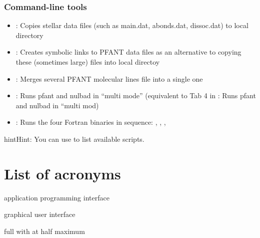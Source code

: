 \documentclass[letterpaper,10pt,english]{sphinxmanual}
\begin{document}
\subsubsection{Command-line tools}
\label{\detokenize{intro:id6}}\begin{itemize}
\item {} 
{\hyperref[\detokenize{autoscripts/script-copy-star::doc}]{}}: Copies stellar data files (such as main.dat, abonds.dat, dissoc.dat) to local directory

\item {} 
{\hyperref[\detokenize{autoscripts/script-link::doc}]{}}: Creates symbolic links to PFANT data files as an alternative to copying these (sometimes large) files into local directoy

\item {} 
{\hyperref[\detokenize{autoscripts/script-merge-molecules::doc}]{}}: Merges several PFANT molecular lines file into a single one

\item {} 
: Runs pfant and nulbad in “multi mode” (equivalent to Tab 4 in : Runs pfant and nulbad in “multi mod)

\item {} 
{\hyperref[\detokenize{autoscripts/script-run4::doc}]{}}: Runs the four Fortran binaries in sequence: , , , 

\end{itemize}

\begin{sphinxadmonition}{hint}{Hint:}
You can use  to list available scripts.
\end{sphinxadmonition}


\section{List of acronyms}
\label{\detokenize{intro:list-of-acronyms}}
 \textendash{} application programming interface

 \textendash{} graphical user interface

 \textendash{} full with at half maximum
\end{document}
